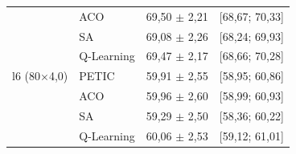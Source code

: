 \begin{table}[htb]
\begin{tabular}{llcc}
         & ACO & 69,50 $\pm$ 2,21 & [68,67; 70,33] \\
         & SA & 69,08 $\pm$ 2,26 & [68,24; 69,93] \\
         & Q-Learning & 69,47 $\pm$ 2,17 & [68,66; 70,28] \\
        \hline
        l6 (80$\times$4,0) & PETIC & 59,91 $\pm$ 2,55 & [58,95; 60,86] \\
         & ACO & 59,96 $\pm$ 2,60 & [58,99; 60,93] \\
         & SA & 59,29 $\pm$ 2,50 & [58,36; 60,22] \\
         & Q-Learning & 60,06 $\pm$ 2,53 & [59,12; 61,01] \\
        \hline
    \end{tabular}
\end{table}
